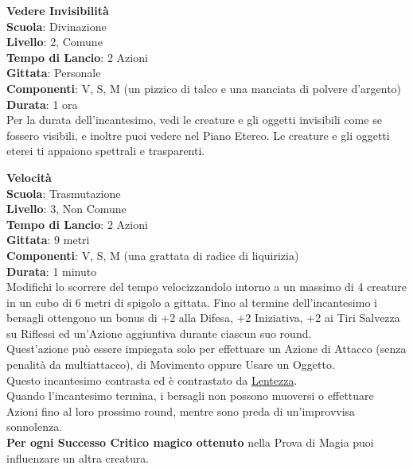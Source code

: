\begin{multicols}{2}
\medskip\textbf{Vedere Invisibilità}\\
\textbf{Scuola}: Divinazione\\
\textbf{Livello}: 2, Comune\\
\textbf{Tempo di Lancio}: 2 Azioni\\
\textbf{Gittata}: Personale\\
\textbf{Componenti}: V, S, M (un pizzico di talco e una manciata di polvere d'argento)\\
\textbf{Durata}: 1 ora\\
Per la durata dell'incantesimo, vedi le creature e gli oggetti invisibili come se fossero visibili, e inoltre puoi vedere nel Piano Etereo. Le creature e gli oggetti eterei ti appaiono spettrali e trasparenti.

\medskip\textbf{Velocità}\\
\textbf{Scuola}: Trasmutazione\\
\textbf{Livello}: 3, Non Comune\\
\textbf{Tempo di Lancio}: 2 Azioni\\
\textbf{Gittata}: 9 metri\\
\textbf{Componenti}: V, S, M (una grattata di radice di liquirizia)\\
\textbf{Durata}: 1 minuto\\
Modifichi lo scorrere del tempo velocizzandolo intorno a un massimo di 4 creature in un cubo di 6 metri di spigolo a gittata. Fino al termine dell'incantesimo i bersagli ottengono un bonus di +2 alla Difesa, +2 Iniziativa, +2 ai Tiri Salvezza su Riflessi ed un'Azione aggiuntiva durante ciascun suo round.\\
Quest'azione può essere impiegata solo per effettuare un Azione di Attacco (senza penalità da multiattacco), di Movimento oppure Usare un Oggetto.\\
Questo incantesimo contrasta ed è contrastato da \hyperlink{lentezza}{Lentezza}.\\
Quando l'incantesimo termina, i bersagli non possono muoversi o effettuare Azioni fino al loro prossimo round, mentre sono preda di un'improvvisa sonnolenza.\\
\textbf{Per ogni Successo Critico magico ottenuto} nella Prova di Magia puoi influenzare un altra creatura.


\end{multicols}
